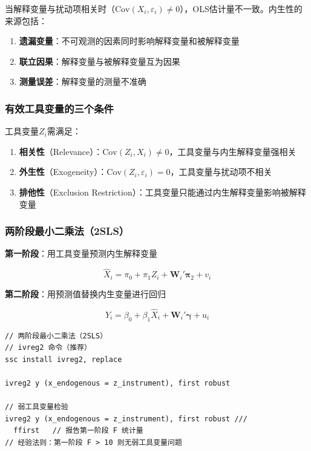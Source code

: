 当解释变量与扰动项相关时（$\text{Cov}(X_i, \varepsilon_i) \neq 0$），OLS估计量不一致。内生性的来源包括：

\begin{enumerate}[leftmargin=2em]
  \item \textbf{遗漏变量}：不可观测的因素同时影响解释变量和被解释变量
  \item \textbf{联立因果}：解释变量与被解释变量互为因果
  \item \textbf{测量误差}：解释变量的测量不准确
\end{enumerate}

\subsubsection{有效工具变量的三个条件}

工具变量$Z_i$需满足：

\begin{enumerate}[leftmargin=2em]
  \item \textbf{相关性}（Relevance）：$\text{Cov}(Z_i, X_i) \neq 0$，工具变量与内生解释变量强相关
  \item \textbf{外生性}（Exogeneity）：$\text{Cov}(Z_i, \varepsilon_i) = 0$，工具变量与扰动项不相关
  \item \textbf{排他性}（Exclusion Restriction）：工具变量只能通过内生解释变量影响被解释变量
\end{enumerate}

\subsubsection{两阶段最小二乘法（2SLS）}

\textbf{第一阶段}：用工具变量预测内生解释变量

\[
\hat{X}_i = \pi_0 + \pi_1 Z_i + \mathbf{W}_i'\boldsymbol{\pi}_2 + v_i
\]

\textbf{第二阶段}：用预测值替换内生变量进行回归

\[
Y_i = \beta_0 + \beta_1 \hat{X}_i + \mathbf{W}_i'\boldsymbol{\gamma} + u_i
\]

\begin{lstlisting}[style=stata]
// 两阶段最小二乘法（2SLS）
// ivreg2 命令（推荐）
ssc install ivreg2, replace

ivreg2 y (x_endogenous = z_instrument), first robust

// 弱工具变量检验
ivreg2 y (x_endogenous = z_instrument), first robust ///
  ffirst   // 报告第一阶段 F 统计量
// 经验法则：第一阶段 F > 10 则无弱工具变量问题
\end{lstlisting}

